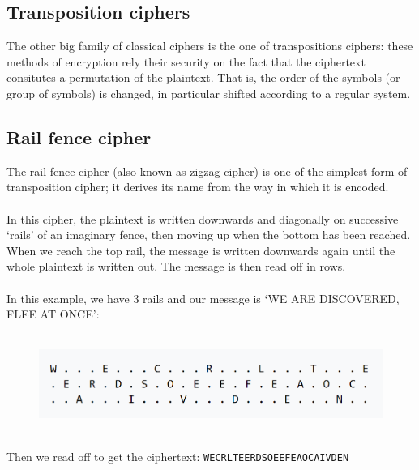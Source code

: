\documentclass[Lau,binding=0.6cm,oneside]{sapthesis}
\begin{document}
\begin{appendices}
\chapter{Transposition ciphers}
The other big family of classical ciphers is the one of transpositions ciphers: these methods of encryption rely their security on the fact that the ciphertext consitutes a permutation of the plaintext. That is, the order of the symbols (or group of symbols) is changed, in particular shifted according to a regular system.

\section{Rail fence cipher}
The \textsf{rail fence cipher} (also known as zigzag cipher) is one of the simplest form of transposition cipher; it derives its name from the way in which it is encoded.\\\\
In this cipher, the plaintext is written downwards and diagonally on successive `rails' of an imaginary fence, then moving up when the bottom has been reached. When we reach the top rail, the message is written downwards again until the whole plaintext is written out. The message is then read off in rows.\\\\
In this example, we have 3 rails and our message is `\textsf{WE ARE DISCOVERED, FLEE AT ONCE}':\\\\

\begin{figure}[H]
\includegraphics[scale=0.42]{rail_fence}
\centering
\caption{}
\centering
\end{figure}
\ \\
Then we read off to get the ciphertext: \colorbox{gray!12}{\small{\texttt{WECRLTEERDSOEEFEAOCAIVDEN}}}\\\\


\end{appendices}
\end{document}
